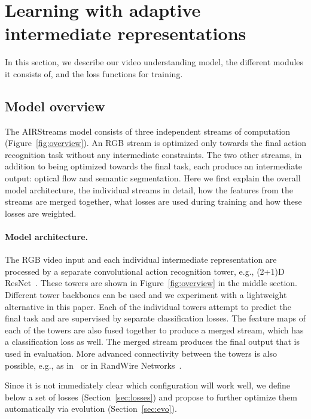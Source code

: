 \documentclass[final]{cvpr}
\begin{document}
\section{Learning with adaptive intermediate representations}

In this section, we describe our video understanding model, the different modules it consists of, and the loss functions for training. 

\subsection{Model overview}

The AIRStreams model consists of three independent streams of computation (Figure~\ref{fig:overview}). An RGB stream is optimized only towards the final action recognition task without any intermediate constraints. The two other streams, in addition to being optimized towards the final task, each produce an intermediate output: optical flow and semantic segmentation. Here we first explain the overall model architecture, the individual streams in detail, how the features from the streams are merged together, what losses are used during training and how these losses are weighted.

\paragraph{Model architecture.}
The RGB video input and each individual intermediate representation are processed by a separate convolutional action recognition tower, e.g., (2+1)D ResNet~\cite{tran2018closer}. These towers are shown in Figure~\ref{fig:overview} in the middle section. Different tower backbones can be used and we experiment with a lightweight alternative in this paper. Each of the individual towers attempt to predict the final task and are supervised by separate classification losses. The feature maps of each of the towers are also fused together to produce a merged stream, which has a classification loss as well. The merged stream produces the final output that is used in evaluation. More advanced connectivity between the towers is also possible, e.g., as in~\cite{Feichtenhofer2016Spatiotemporal} or in RandWire Networks~\cite{xie2019randwire}. 

Since it is not immediately clear which configuration will work well, we define below a set of losses (Section~\ref{sec:losses}) and propose to further optimize them automatically via evolution (Section~\ref{sec:evo}). 
\end{document}
